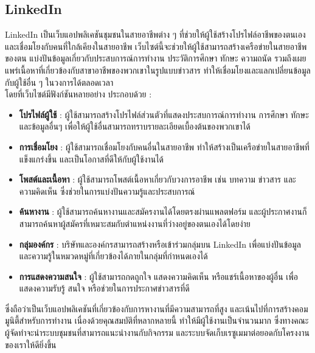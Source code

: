 \subsection{LinkedIn}
LinkedIn เป็นเว็บแอปพลิเคชันชุมชนในสายอาชีพต่าง ๆ ที่ช่วยให้ผู้ใช้สร้างโปรไฟล์อาชีพของตนเองและเชื่อมโยงกับคนที่ใกล้เคียงในสายอาชีพ 
เว็บไซต์นี้จะช่วยให้ผู้ใช้สามารถสร้างเครือข่ายในสายอาชีพของตน แบ่งปันข้อมูลเกี่ยวกับประสบการณ์การทำงาน ประวัติการศึกษา ทักษะ ความถนัด 
รวมถึงเผยแพร่เนื้อหาที่เกี่ยวข้องกับสาขาอาชีพของพวกเขาในรูปแบบข่าวสาร ทำให้เชื่อมโยงและแลกเปลี่ยนข้อมูลกับผู้ใช้อื่น ๆ ในวงการได้ตลอดเวลา \\
โดยที่เว็บไซต์มีฟังก์ชันหลายอย่าง ประกอบด้วย :
\begin{itemize}
    \item \textbf{โปรไฟล์ผู้ใช้} : ผู้ใช้สามารถสร้างโปรไฟล์ส่วนตัวที่แสดงประสบการณ์การทำงาน การศึกษา ทักษะ และข้อมูลอื่นๆ เพื่อให้ผู้ใช้อื่นสามารถทราบรายละเอียดเบื้องต้นของพวกเขาได้
    \item \textbf{การเชื่อมโยง} : ผู้ใช้สามารถเชื่อมโยงกับคนอื่นในสายอาชีพ ทำให้สร้างเป็นเครือข่ายในสายอาชีพที่แข็งแกร่งขึ้น และเป็นโอกาสที่ดีให้กับผู้ใช้งานได้
    \item \textbf{โพสต์และเนื้อหา} : ผู้ใช้สามารถโพสต์เนื้อหาเกี่ยวกับวงการอาชีพ เช่น บทความ ข่าวสาร และความคิดเห็น ซึ่งช่วยในการแบ่งปันความรู้และประสบการณ์
    \item \textbf{ค้นหางาน} : ผู้ใช้สามารถค้นหางานและสมัครงานได้โดยตรงผ่านแพลตฟอร์ม และผู้ประกาศงานก็สามารถค้นหาผู้สมัครที่เหมาะสมกับตำแหน่งงานที่ว่างอยู่ของตนเองได้โดยง่าย
    \item \textbf{กลุ่มองค์กร} : บริษัทและองค์กรสามารถสร้างหรือเข้าร่วมกลุ่มบน LinkedIn เพื่อแบ่งปันข้อมูลและความรู้ในหมวดหมู่ที่เกี่ยวข้องได้ภายในกลุ่มที่กำหนดเองได้
    \item \textbf{การแสดงความสนใจ} : ผู้ใช้สามารถกดถูกใจ แสดงความคิดเห็น หรือแชร์เนื้อหาของผู้อื่น เพื่อแสดงความรับรู้ สนใจ หรือช่วยในการประกาศข่าวสารที่ดี
\end{itemize}
\par ซึ่งถือว่าเป็นเว็บแอปพลิเคชันที่เกี่ยวข้องกับการหางานที่มีความสามารถที่สูง และเน้นไปที่การสร้างคอมมูนิตี้สำหรับการทำงาน เนื่องด้วยคุณสมบัติที่หลากหลายนี้ 
ทำให้มีผู้ใช้งานเป็นจำนวนมาก ซึ่งทางคณะผู้จัดทำจะนำระบบชุมชนที่สามารถแนะนำงานกับกิจกรรม และระบบจัดเก็บเรซูเมมาต่อยอดกับโครงงานของเราให้ดียิ่งขึ้น


